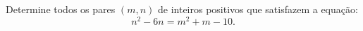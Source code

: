 Determine todos os pares $(m, n)$ de inteiros positivos que satisfazem a equação:
$$n^2 - 6n = m^2 + m - 10.$$
